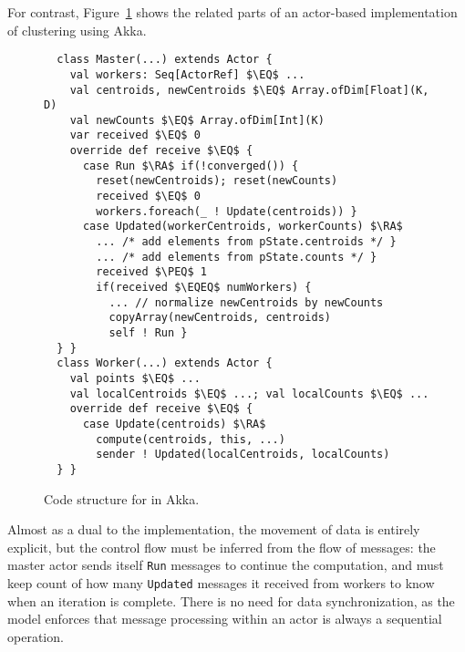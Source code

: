 For contrast, Figure~\ref{fig:kmeansakka} shows the related parts of an
actor-based implementation of \kmeans clustering using Akka.
\begin{figure}
\begin{lstlisting}
  class Master(...) extends Actor {
    val workers: Seq[ActorRef] $\EQ$ ...
    val centroids, newCentroids $\EQ$ Array.ofDim[Float](K, D)
    val newCounts $\EQ$ Array.ofDim[Int](K)
    var received $\EQ$ 0
    override def receive $\EQ$ {
      case Run $\RA$ if(!converged()) {
        reset(newCentroids); reset(newCounts)
        received $\EQ$ 0
        workers.foreach(_ ! Update(centroids)) }
      case Updated(workerCentroids, workerCounts) $\RA$
        ... /* add elements from pState.centroids */ }
        ... /* add elements from pState.counts */ }
        received $\PEQ$ 1
        if(received $\EQEQ$ numWorkers) {
          ... // normalize newCentroids by newCounts
          copyArray(newCentroids, centroids)
          self ! Run }
  } }
  class Worker(...) extends Actor {
    val points $\EQ$ ...
    val localCentroids $\EQ$ ...; val localCounts $\EQ$ ...
    override def receive $\EQ$ {
      case Update(centroids) $\RA$
        compute(centroids, this, ...)
        sender ! Updated(localCentroids, localCounts)
  } }
\end{lstlisting}
\caption{Code structure for \kmeans in Akka.\label{fig:kmeansakka}}
\end{figure}
Almost as a dual to the \apgas implementation, the movement of data is entirely
explicit, but the control flow must be inferred from the flow of messages: the
master actor sends itself \lstinline{Run} messages to continue the computation,
and must keep count of how many \lstinline{Updated} messages it received from
workers to know when an iteration is complete. There is no need for data
synchronization, as the model enforces that message processing within an actor
is always a sequential operation.
